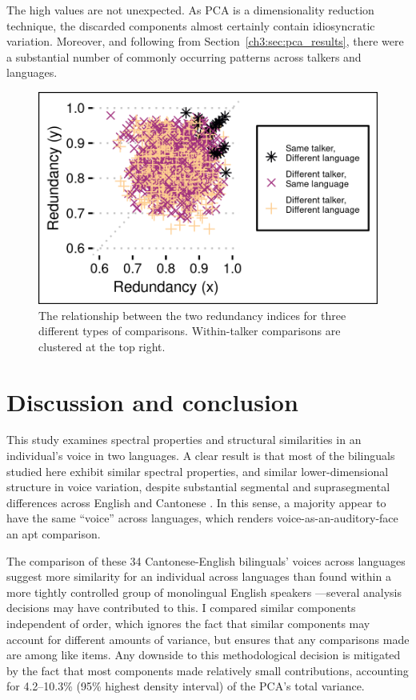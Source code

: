 The high values are not unexpected. As PCA is a dimensionality reduction technique, the discarded components almost certainly contain idiosyncratic variation. Moreover, and following from Section~\ref{ch3:sec:pca_results}, there were a substantial number of commonly occurring patterns across talkers and languages. 

\begin{figure}[htbp]
\begin{center}
\includegraphics[width=0.875\linewidth]{figures/3-reds_pretty.png} 
\caption{The relationship between the two redundancy indices for three different types of comparisons. Within-talker comparisons are clustered at the top right.}
\label{ch3:fig:redundancy}
\end{center}
\end{figure}






\section{Discussion and conclusion}\label{ch3:sec:discussion}

This study examines spectral properties and structural similarities in an individual's voice in two languages. A clear result is that most of the bilinguals studied here exhibit similar spectral properties, and similar lower-dimensional structure in voice variation, despite substantial segmental and suprasegmental differences across English and Cantonese \citep{matthews_2013_cantonese}. In this sense, a majority appear to have the same ``voice'' across languages, which renders voice-as-an-auditory-face an apt comparison.

The comparison of these 34 Cantonese-English bilinguals' voices across languages suggest more similarity for an individual across languages than found within a more tightly controlled group of monolingual English speakers \citep{lee_2019_acoustic}---several analysis decisions may have contributed to this. I compared similar components independent of order, which ignores the fact that similar components may account for different amounts of variance, but ensures that any comparisons made are among like items. Any downside to this methodological decision is mitigated by the fact that most components made relatively small contributions, accounting for 4.2--10.3\% (95\% highest density interval) of the PCA's total variance. 

